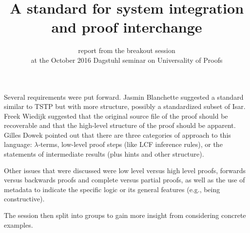 \documentclass{article}
\begin{document}
\title{A standard for system integration and proof interchange}
\author{report from the breakout session \\at the October 2016 Dagstuhl seminar on Universality of Proofs}
\maketitle

Several requirements were put forward.
Jasmin Blanchette suggested a standard similar to TSTP but with more structure, possibly a standardized subset of Isar.
Freek Wiedijk suggested that the original source file of the proof should be recoverable and that the high-level structure of the proof should be apparent.
Gilles Dowek pointed out that there are three categories of approach to this language: $\lambda$-terms, low-level proof steps (like LCF inference rules), or the statements of intermediate results (plus hints and other structure).

Other issues that were discussed were low level versus high level proofs, forwards versus backwards proofs and complete versus partial proofs, as well as the use of metadata to indicate the specific logic or its general features (e.g., being constructive).

The session then split into groups to gain more insight from considering concrete examples.

\end{document}
